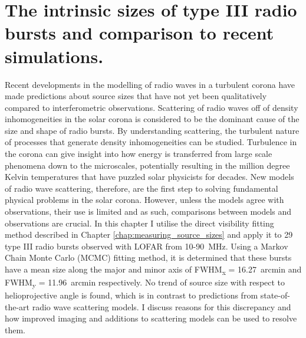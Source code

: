 \doublespacing
\chapter{The intrinsic sizes of type III radio bursts and comparison to recent simulations.}
\label{chap:observations_vs_theory}
Recent developments in the modelling of radio waves in a turbulent corona have made predictions about source sizes that have not yet been qualitatively compared to interferometric observations. Scattering of radio waves off of density inhomogeneities in the solar corona is considered to be the dominant cause of the size and shape of radio bursts. By understanding scattering, the turbulent nature of processes that generate density inhomogeneities can be studied. Turbulence in the corona can give insight into how energy is transferred from large scale phenomena down to the microscales, potentially resulting in the million degree Kelvin temperatures that have puzzled solar physicists for decades. New models of radio wave scattering, therefore, are the first step to solving fundamental physical problems in the solar corona. However, unless the models agree with observations, their use is limited and as such, comparisons between models and observations are crucial. In this chapter I utilise the direct visibility fitting method described in Chapter \ref{chap:measuring_source_sizes} and apply it to 29 type III radio bursts observed with LOFAR from 10-90~MHz. Using a Markov Chain Monte Carlo (MCMC) fitting method, it is determined that these bursts have a mean size along the major and minor axis of FWHM\textsubscript{x} = 16.27~arcmin and FWHM\textsubscript{y} = 11.96~arcmin respectively. No trend of source size with respect to helioprojective angle is found, which is in contrast to predictions from state-of-the-art radio wave scattering models. I discuss reasons for this discrepancy and how improved imaging and additions to scattering models can be used to resolve them.

